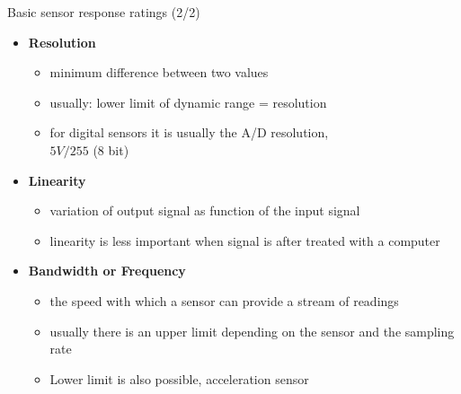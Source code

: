 \documentclass[compress]{beamer}
\begin{document}
\begin{frame}{Basic sensor response ratings (2/2)}

    \begin{itemize}
        \item {\bf Resolution}
            \begin{itemize}
                \item minimum difference between two values
                \item usually: lower limit of dynamic range = resolution
                \item for digital sensors it is usually the A/D resolution,\\ \eg $ 5V / 255 $ (8 bit) 

            \end{itemize}

        \item {\bf Linearity}

            \begin{itemize}
                \item
                    variation of output signal as function of the input signal
                \item
                    linearity is less important when signal is after treated with a
                    computer
            \end{itemize}

        \item {\bf Bandwidth or Frequency}

            \begin{itemize}
                \item the speed with which a sensor can provide a stream of readings
                \item usually there is an upper limit depending on the sensor and the
                    sampling rate
                \item Lower limit is also possible, \eg acceleration sensor
            \end{itemize}

    \end{itemize}
\end{frame}
\end{document}
